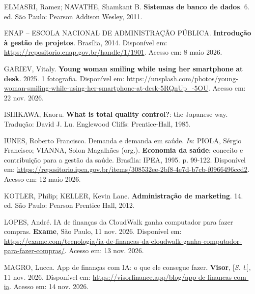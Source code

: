 \vspace{\baselineskip}

ELMASRI, Ramez; NAVATHE, Shamkant B. \textbf{Sistemas de banco de dados}. 6. ed. São Paulo: Pearson Addison Wesley, 2011.

\vspace{\baselineskip}

ENAP -- ESCOLA NACIONAL DE ADMINISTRAÇÃO PÚBLICA. \textbf{Introdução à gestão de projetos}. Brasília, 2014. Disponível em: \url{https://repositorio.enap.gov.br/handle/1/1901}. Acesso em: 8 maio 2026.

\vspace{\baselineskip}

GARIEV, Vitaly. \textbf{Young woman smiling while using her smartphone at desk}. 2025. 1 fotografia. Disponível em: \url{https://unsplash.com/photos/young-woman-smiling-while-using-her-smartphone-at-desk-5RQnUp_-5OU}. Acesso em: 22 nov. 2026.

\vspace{\baselineskip}

ISHIKAWA, Kaoru. \textbf{What is total quality control?}: the Japanese way. Tradução: David J. Lu. Englewood Cliffs: Prentice-Hall, 1985.

\vspace{\baselineskip}

IUNES, Roberto Francisco. Demanda e demanda em saúde. \textit{In}: PIOLA, Sérgio Francisco; VIANNA, Solon Magalhães (org.). \textbf{Economia da saúde}: conceito e contribuição para a gestão da saúde. Brasília: IPEA, 1995. p. 99-122. Disponível em: \url{https://repositorio.ipea.gov.br/items/308532ee-2bf8-4e7d-b7cb-f0966496ccd2}. Acesso em: 12 maio 2026.

\vspace{\baselineskip}

KOTLER, Philip; KELLER, Kevin Lane. \textbf{Administração de marketing}. 14. ed. São Paulo: Pearson Prentice Hall, 2012.

\vspace{\baselineskip}

LOPES, André. IA de finanças da CloudWalk ganha computador para fazer compras. \textbf{Exame}, São Paulo, 11 nov. 2026. Disponível em: \url{https://exame.com/tecnologia/ia-de-financas-da-cloudwalk-ganha-computador-para-fazer-compras/}. Acesso em: 13 nov. 2026.

\vspace{\baselineskip}

MAGRO, Lucca. App de finanças com IA: o que ele consegue fazer. \textbf{Visor}, [\textit{S. l.}], 11 nov. 2026. Disponível em: \url{https://visorfinance.app/blog/app-de-financas-com-ia}. Acesso em: 14 nov. 2026.

